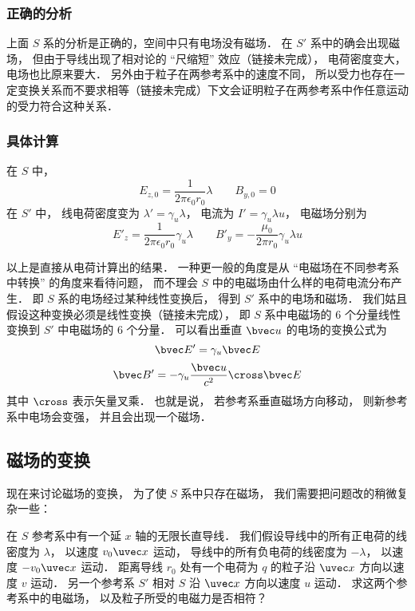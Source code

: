 \subsubsection{正确的分析}
上面 $S$ 系的分析是正确的，空间中只有电场没有磁场． 在 $S'$ 系中的确会出现磁场， 但由于导线出现了相对论的 “尺缩短” 效应（链接未完成）， 电荷密度变大， 电场也比原来要大． 另外由于粒子在两参考系中的速度不同， 所以受力也存在一定变换关系而不要求相等（链接未完成）下文会证明粒子在两参考系中作任意运动的受力符合这种关系．

\subsubsection{具体计算}
在 $S$ 中，
\begin{equation}
E_{z,0} = \frac{1}{2\pi\epsilon_0 r_0} \lambda
\qquad
B_{y,0} = 0
\end{equation}
在 $S'$ 中， 线电荷密度变为 $\lambda' = \gamma_u \lambda$， 电流为 $I' = \gamma_u \lambda u$， 电磁场分别为
\begin{equation}
E'_z = \frac{1}{2\pi\epsilon_0 r_0} \gamma_u \lambda
\qquad
B'_y = -\frac{\mu_0}{2\pi r_0}\gamma_u \lambda u
\end{equation}

以上是直接从电荷计算出的结果． 一种更一般的角度是从 “电磁场在不同参考系中转换” 的角度来看待问题， 而不理会 $S$ 中的电磁场由什么样的电荷电流分布产生． 即 $S$ 系的电场经过某种线性变换后， 得到 $S'$ 系中的电场和磁场． 我们姑且假设这种变换必须是线性变换（链接未完成）， 即 $S$ 系中电磁场的 6 个分量线性变换到 $S'$ 中电磁场的 6 个分量． 可以看出垂直 $\bvec u$ 的电场的变换公式为
\begin{equation}\label{EMRef_eq5}
\bvec E' = \gamma_u \bvec E
\end{equation}
\begin{equation}\label{EMRef_eq6}
\bvec B' = -\gamma_u \frac{\bvec u}{c^2} \cross \bvec E
\end{equation}
其中 $\cross$ 表示矢量叉乘． 也就是说， 若参考系垂直磁场方向移动， 则新参考系中电场会变强， 并且会出现一个磁场．


\subsection{磁场的变换}
现在来讨论磁场的变换， 为了使 $S$ 系中只存在磁场， 我们需要把问题改的稍微复杂一些：

在 $S$ 参考系中有一个延 $x$ 轴的无限长直导线． 我们假设导线中的所有正电荷的线密度为 $\lambda$， 以速度 $v_0\uvec x$ 运动， 导线中的所有负电荷的线密度为 $-\lambda$，  以速度 $-v_0\uvec x$ 运动． 距离导线 $r_0$ 处有一个电荷为 $q$ 的粒子沿 $\uvec x$ 方向以速度 $v$ 运动． 另一个参考系 $S'$ 相对 $S$ 沿 $\uvec x$ 方向以速度 $u$ 运动． 求这两个参考系中的电磁场， 以及粒子所受的电磁力是否相符？

